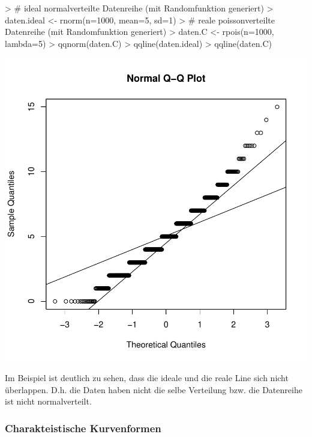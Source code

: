 \begin{Schunk}
\begin{Sinput}
> # ideal normalverteilte Datenreihe (mit Randomfunktion generiert)
> daten.ideal <- rnorm(n=1000, mean=5, sd=1)
> # reale poissonverteilte Datenreihe (mit Randomfunktion generiert)
> daten.C <- rpois(n=1000, lambda=5)
> qqnorm(daten.C)
> qqline(daten.ideal)
> qqline(daten.C)
\end{Sinput}
\end{Schunk}
\includegraphics{definitionen-030}

\noindent
Im Beispiel ist deutlich zu sehen, dass die ideale und die reale Line 
sich nicht überlappen. D.h. die Daten haben nicht die selbe Verteilung
bzw. die Datenreihe ist nicht normalverteilt.

\subsubsection{Charakteistische Kurvenformen}


